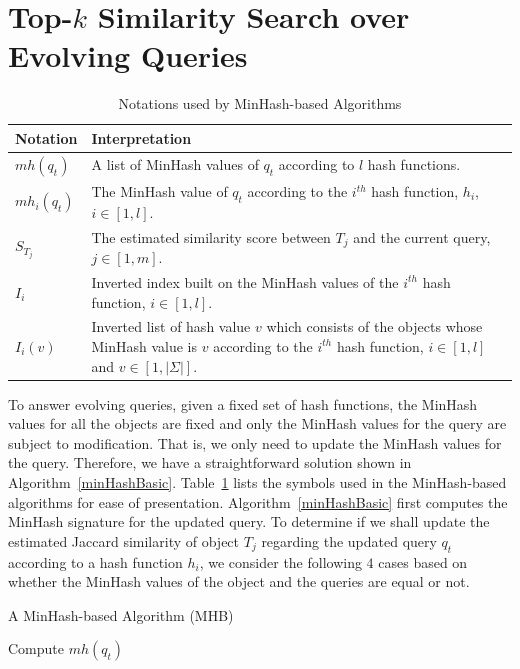 \section{Top-$k$ Similarity Search over Evolving Queries}\label{sec:evolve-minHash}
\begin{table}[tb]
\centering
\caption{Notations used by MinHash-based Algorithms}
\begin{tabular}{|l| p{10cm}  |} \hline
      Notation & Interpretation \\ \hline
      $mh(q_t)$ & A list of MinHash values of $q_t$ according to $l$ hash functions. \\ \hline
      $mh_i(q_t)$ & The MinHash value of $q_t$ according to the $i^{th}$ hash function, $h_i$, $i \in [1, l]$. \\ \hline
      $S_{T_j}$ & The estimated similarity score between $T_j$ and the current query, $j \in [1, m]$.\\ \hline
      $I_i$ & Inverted index built on the MinHash values of the $i^{th}$ hash function, $i \in [1, l]$.\\ \hline
      $I_i(v)$ &  Inverted list of hash value $v$ which consists of the objects whose MinHash value is $v$ according to the $i^{th}$ hash function, $i \in [1, l]$ and $v \in [1,|\Sigma|]$. \\ \hline
\end{tabular}
  \label{Notations}
\end{table}  

To answer evolving queries, given a fixed set of hash functions, the MinHash values for all the objects are fixed and only the MinHash values for the query are subject to modification. That is, we only need to update the MinHash values for the query. Therefore, we have a straightforward solution shown in Algorithm~\ref{minHashBasic}. Table~\ref{Notations} lists the symbols used in the MinHash-based algorithms for ease of presentation. Algorithm~\ref{minHashBasic} first computes the MinHash signature for the updated query. To determine if we shall update the estimated Jaccard similarity of object $T_j$ regarding the updated query $q_t$ according to a hash function $h_i$, we consider the following $4$ cases based on whether the MinHash values of the object and the queries are equal or not.

\begin{algorithm2e}[t]
 \SetAlgoLined%
 \caption{A MinHash-based Algorithm (MHB)} 
 \label{minHashBasic}

 Compute $mh(q_{t})$\;
\end{algorithm2e}   


